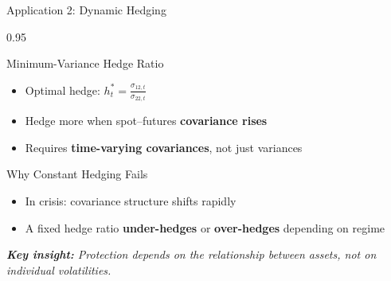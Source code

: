 \documentclass[9pt, aspectratio=169, t]{beamer}
\begin{document}
\begin{frame}{Application 2: Dynamic Hedging}
    \begin{cminipage}{0.95\textwidth}
    {\footnotesize
    \begin{block}{Minimum-Variance Hedge Ratio}
        \begin{itemize}\setlength{\itemsep}{2pt}
            \item Optimal hedge: $h_t^{*} = \frac{\sigma_{12,t}}{\sigma_{22,t}}$
            \item Hedge more when spot--futures \textbf{covariance rises}
            \item Requires \textbf{time-varying covariances}, not just variances
        \end{itemize}
    \end{block}
    \vspace{0.1cm}
    \begin{alertblock}{Why Constant Hedging Fails}
        \begin{itemize}\setlength{\itemsep}{0pt}
            \item In crisis: covariance structure shifts rapidly
            \item A fixed hedge ratio \textbf{under-hedges} or \textbf{over-hedges} depending on regime
        \end{itemize}
    \end{alertblock}
    \vspace{0.2cm}
    \textit{\textbf{Key insight:} Protection depends on the relationship between assets, not on individual volatilities.}
    }
    \end{cminipage}
\end{frame}
\end{document}
